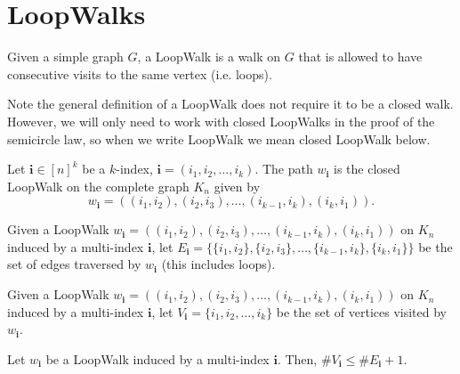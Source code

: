 \chapter{LoopWalks}


\begin{definition}
  \label{def:loop_walk}
  Given a simple graph $G$, a LoopWalk is a walk on $G$ that is allowed to have consecutive visits
  to the same vertex (i.e. loops).
\end{definition}


Note the general definition of a LoopWalk does not require it to be a closed walk. However, we will
only need to work with closed LoopWalks in the proof of the semicircle law, so when we write
LoopWalk we mean closed LoopWalk below.


\begin{definition}
  \label{def:graph_walk_multi_index}
  Let $\mathbf{i} \in[n]^k$ be a $k$-index, $\mathbf{i}=\left(i_1, i_2, \ldots, i_k\right)$. The path
  $w_{\mathbf{i}}$ is the closed LoopWalk on the complete graph $K_n$ given by
  $$
  w_\mathbf{i}=((i_1, i_2),(i_2, i_3), \ldots,(i_{k-1}, i_k),(i_k, i_1)).
  $$
\end{definition}


\begin{definition}
  \label{def:graph_walk_edges}
  Given a LoopWalk $w_\mathbf{i}=((i_1, i_2),(i_2, i_3), \ldots,(i_{k-1}, i_k),(i_k, i_1))$ on
  $K_n$ induced by a multi-index $\mathbf{i}$, let
  $E_\mathbf{i}= \{\{i_1, i_2\},\{i_2, i_3\}, \ldots,\{i_{k-1}, i_k\}, \{i_k, i_1\}\}$ be the set
  of edges traversed by $w_{\mathbf{i}}$ (this includes loops).
\end{definition}


\begin{definition}
  \label{def:graph_walk_vertices}
  Given a LoopWalk $w_\mathbf{i}=((i_1, i_2),(i_2, i_3), \ldots,(i_{k-1}, i_k),(i_k, i_1))$ on
  $K_n$ induced by a multi-index $\mathbf{i}$, let $V_\mathbf{i}= \{i_1, i_2, \dots, i_k\}$ be the set
  of vertices visited by $w_{\mathbf{i}}$.
\end{definition}



\begin{proposition}%
  \label{prop:vertex_edge_inequality}
  Let $w_{\mathbf{i}}$ be a LoopWalk induced by a multi-index $\mathbf{i}$. Then,
  $\#V_{\mathbf{i}}\le \#E_{\mathbf{i}}+1$.
\end{proposition}

